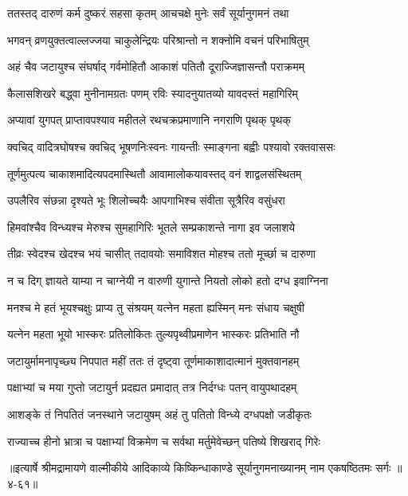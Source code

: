 
\twolineshloka
{ततस्तद् दारुणं कर्म दुष्करं सहसा कृतम्}
{आचचक्षे मुनेः सर्वं सूर्यानुगमनं तथा} %

\twolineshloka
{भगवन् व्रणयुक्तत्वाल्लज्जया चाकुलेन्द्रियः}
{परिश्रान्तो न शक्नोमि वचनं परिभाषितुम्} %

\twolineshloka
{अहं चैव जटायुश्च संघर्षाद् गर्वमोहितौ}
{आकाशं पतितौ दूराज्जिज्ञासन्तौ पराक्रमम्} %

\twolineshloka
{कैलासशिखरे बद्ध्वा मुनीनामग्रतः पणम्}
{रविः स्यादनुयातव्यो यावदस्तं महागिरिम्} %

\twolineshloka
{अप्यावां युगपत् प्राप्तावपश्याव महीतले}
{रथचक्रप्रमाणानि नगराणि पृथक् पृथक्} %

\twolineshloka
{क्वचिद् वादित्रघोषश्च क्वचिद् भूषणनिःस्वनः}
{गायन्तीः स्माङ्गना बह्वीः पश्यावो रक्तवाससः} %

\twolineshloka
{तूर्णमुत्पत्य चाकाशमादित्यपदमास्थितौ}
{आवामालोकयावस्तद् वनं शाद्वलसंस्थितम्} %

\twolineshloka
{उपलैरिव संछन्ना दृश्यते भूः शिलोच्चयैः}
{आपगाभिश्च संवीता सूत्रैरिव वसुंधरा} %

\twolineshloka
{हिमवांश्चैव विन्ध्यश्च मेरुश्च सुमहागिरिः}
{भूतले सम्प्रकाशन्ते नागा इव जलाशये} %

\twolineshloka
{तीव्रः स्वेदश्च खेदश्च भयं चासीत् तदावयोः}
{समाविशत मोहश्च ततो मूर्च्छा च दारुणा} %

\twolineshloka
{न च दिग् ज्ञायते याम्या न चाग्नेयी न वारुणी}
{युगान्ते नियतो लोको हतो दग्ध इवाग्निना} %

\twolineshloka
{मनश्च मे हतं भूयश्चक्षुः प्राप्य तु संश्रयम्}
{यत्नेन महता ह्यस्मिन् मनः संधाय चक्षुषी} %

\twolineshloka
{यत्नेन महता भूयो भास्करः प्रतिलोकितः}
{तुल्यपृथ्वीप्रमाणेन भास्करः प्रतिभाति नौ} %

\twolineshloka
{जटायुर्मामनापृच्छ्य निपपात महीं ततः}
{तं दृष्ट्वा तूर्णमाकाशादात्मानं मुक्तवानहम्} %

\twolineshloka
{पक्षाभ्यां च मया गुप्तो जटायुर्न प्रदह्यत}
{प्रमादात् तत्र निर्दग्धः पतन् वायुपथादहम्} %

\twolineshloka
{आशङ्के तं निपतितं जनस्थाने जटायुषम्}
{अहं तु पतितो विन्ध्ये दग्धपक्षो जडीकृतः} %

\twolineshloka
{राज्याच्च हीनो भ्रात्रा च पक्षाभ्यां विक्रमेण च}
{सर्वथा मर्तुमेवेच्छन् पतिष्ये शिखराद् गिरेः} %


॥इत्यार्षे श्रीमद्रामायणे वाल्मीकीये आदिकाव्ये किष्किन्धाकाण्डे सूर्यानुगमनाख्यानम् नाम एकषष्ठितमः सर्गः ॥४-६१॥
